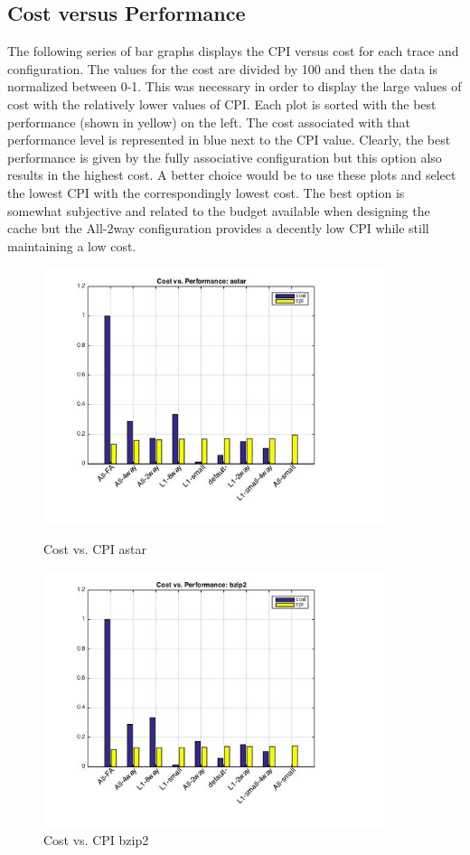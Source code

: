 \documentclass[11pt,titlepage]{article}
\begin{document}
    \subsection{Cost versus Performance} \label{sec:costVperf}
        The following series of bar graphs displays the CPI versus cost for each trace and configuration. The values for the cost are divided by 100 and then the data is normalized between 0-1. This was necessary in order to display the large values of cost with the relatively lower values of CPI. Each plot is sorted with the best performance (shown in yellow) on the left. The cost associated with that performance level is represented in blue next to the CPI value. Clearly, the best performance is given by the fully associative configuration but this option also results in the highest cost. A better choice would be to use these plots and select the lowest CPI with the correspondingly lowest cost. The best option is somewhat subjective and related to the budget available when designing the cache but the All-2way configuration provides a decently low CPI while still maintaining a low cost.
        \begin{figure}[H]
            \centering
            \begin{minipage}{.5\textwidth}
                \centering
                \includegraphics[width=10cm]{cvpastar}
                \caption{Cost vs. CPI astar}
                \label{fig:cvpastar}
            \end{minipage}%
            \begin{minipage}{.5\textwidth}
                \centering
                \includegraphics[width=10cm]{cvpbzip2}
                \caption{Cost vs. CPI bzip2}
                \label{fig:cvpbzip2}
            \end{minipage}
        \end{figure}
\end{document}
